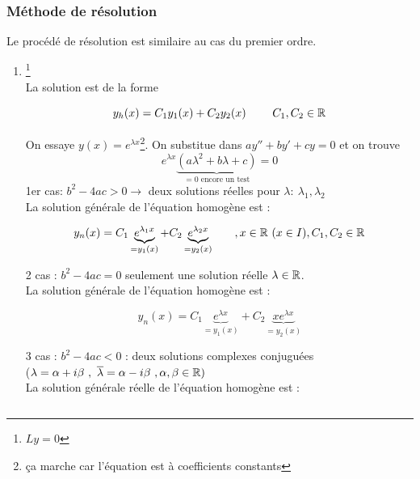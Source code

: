\documentclass[12pt,a4paper]{article}
\begin{document}
\subsubsection{Méthode de résolution}
Le procédé de résolution est similaire au cas du premier ordre.
\begin{enumerate}[label=\roman*)]
	\item {}\footnote{$Ly=0$}\\
	La solution est de la forme 
	\begin{boite}
		\begin{equation*}
			y_h(x) = C_1y_1(x) + C_2y_2(x)\ \qquad C_1,C_2 \in\mathbb{R}
		\end{equation*}
	\end{boite}
	On essaye $y(x) = e^{\lambda x}$\footnote{ça marche car l'équation est à coefficients constants}. On substitue dans $ay'' + by' + cy = 0$ et on trouve
	\begin{equation*}
		e^{\lambda x}\underbrace{(a\lambda^2 + b\lambda + c)}_{=0\text{ encore un test}} = 0
	\end{equation*}
	1er cas: $ b^2-4ac > 0 \to $ deux solutions réelles pour $\lambda : \ \lambda_1,\lambda_2$\\
	La solution générale de l'équation homogène est :
	\begin{boite}
		\begin{equation*}
			y_n(x) = C_1\underbrace{e^{\lambda_1 x}}_{=y_1(x)} + C_2 \underbrace{e^{\lambda_2 x}}_{=y_2(x)} \qquad ,x\in\mathbb{R} \ (x\in I), C_1,C_2 \in \mathbb{R}
		\end{equation*}
	\end{boite}
	2 cas : $b^2 - 4ac = 0$ seulement une solution réelle $\lambda \in\mathbb{R}$.\\
	La solution générale de l'équation homogène est :
	\begin{boite}
		\begin{equation*}
			y_n(x) = C_1\underbrace{e^{\lambda x}}_{=y_1(x)} + C_2\underbrace{xe^{\lambda x}}_{=y_2(x)}
		\end{equation*}
	\end{boite}
	3 cas : $b^2-4ac < 0$ : deux solutions complexes conjuguées\\
	($\lambda = \alpha+ i\beta \ , \ \overline{\lambda} = \alpha - i\beta \ ,\alpha,\beta \in \R)$\\
	La solution générale réelle de l'équation homogène est :
	\begin{boite}
		\begin{equation*}

\end{equation*}
\end{boite}
\end{enumerate}
\end{document}
